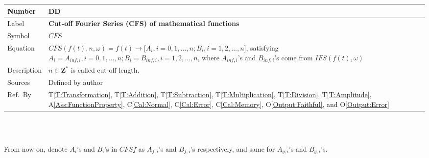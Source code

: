 \documentclass[12pt]{article}
\newcommand{\colAwidth}{0.13\textwidth}
\newcommand{\colBwidth}{0.82\textwidth}
\newcounter{defnum} %
\newcounter{datadefnum} %
\newcommand{\tref}[1]{T\ref{#1}}
\newcommand{\aref}[1]{A\ref{#1}}
\newcommand{\calref}[1]{C\ref{#1}}
\newcommand{\oref}[1]{O\ref{#1}}
\begin{document}
\noindent
\begin{minipage}{\textwidth}
	\renewcommand*{\arraystretch}{1.5}
	\begin{tabular}{| p{\colAwidth} | p{\colBwidth}|}
		\hline
		\rowcolor[gray]{0.9}
		Number& DD{datadefnum}\thedatadefnum \label{DD:CFS}\\
		\hline
		Label& \bf Cut-off Fourier Series (CFS) of mathematical functions\\
		\hline
		Symbol &$\mathit{CFS}$\\
		\hline
		Equation&$\mathit{CFS}(f(t), n, \omega)=f(t)\rightarrow \big[A_i, i=0, 1, ..., n; B_i, i=1, 2, ..., n\big]$, satisfying $A_i=A_{inf, i}, i=0, 1, ..., n; B_i=B_{inf, i}, i=1, 2, ..., n$, where $A_{inf, i}$'s and $B_{inf, i}$'s come from $\mathit{IFS}(f(t), \omega)$ \\
		\hline
		Description & $n\in \mathbf{Z}^{*}$ is called cut-off length.\\
		\hline
		Sources& Defined by author\\
		\hline
		Ref.\ By & \tref{T:Transformation}, \tref{T:Addition}, \tref{T:Subtraction}, \tref{T:Multiplication}, \tref{T:Division}, \tref{T:Amplitude}, \aref{Ass:FunctionProperty},  \calref{Cal:Normal}, \calref{Cal:Error}, \calref{Cal:Memory}, \oref{Output:Faithful}, and \oref{Output:Error}\\
		\hline
	\end{tabular}
\end{minipage}\\
~\newline

From now on, denote $A_i$'s and $B_i$'s in $\mathit{CFSf}$ as $A_{f, i}$'s and $B_{f, i}$'s respectively, and same for $A_{g, i}$'s and $B_{g, i}$'s.
\end{document}
